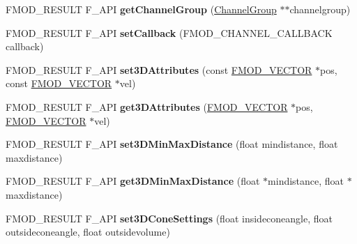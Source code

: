 \begin{DoxyCompactItemize}
\item 
\hypertarget{class_f_m_o_d_1_1_channel_a4b6d310d04eb844190db7a4074af2b2c}{F\-M\-O\-D\-\_\-\-R\-E\-S\-U\-L\-T F\-\_\-\-A\-P\-I {\bfseries get\-Channel\-Group} (\hyperlink{class_f_m_o_d_1_1_channel_group}{Channel\-Group} $\ast$$\ast$channelgroup)}\label{class_f_m_o_d_1_1_channel_a4b6d310d04eb844190db7a4074af2b2c}

\item 
\hypertarget{class_f_m_o_d_1_1_channel_a5cbbb69ad8d74d36d7b469a77450c3fa}{F\-M\-O\-D\-\_\-\-R\-E\-S\-U\-L\-T F\-\_\-\-A\-P\-I {\bfseries set\-Callback} (F\-M\-O\-D\-\_\-\-C\-H\-A\-N\-N\-E\-L\-\_\-\-C\-A\-L\-L\-B\-A\-C\-K callback)}\label{class_f_m_o_d_1_1_channel_a5cbbb69ad8d74d36d7b469a77450c3fa}

\item 
\hypertarget{class_f_m_o_d_1_1_channel_ae0bb0f7c1c1a807bde8ab9e9c3870785}{F\-M\-O\-D\-\_\-\-R\-E\-S\-U\-L\-T F\-\_\-\-A\-P\-I {\bfseries set3\-D\-Attributes} (const \hyperlink{struct_f_m_o_d___v_e_c_t_o_r}{F\-M\-O\-D\-\_\-\-V\-E\-C\-T\-O\-R} $\ast$pos, const \hyperlink{struct_f_m_o_d___v_e_c_t_o_r}{F\-M\-O\-D\-\_\-\-V\-E\-C\-T\-O\-R} $\ast$vel)}\label{class_f_m_o_d_1_1_channel_ae0bb0f7c1c1a807bde8ab9e9c3870785}

\item 
\hypertarget{class_f_m_o_d_1_1_channel_ab0f5e28337f9303c75f80d139201a858}{F\-M\-O\-D\-\_\-\-R\-E\-S\-U\-L\-T F\-\_\-\-A\-P\-I {\bfseries get3\-D\-Attributes} (\hyperlink{struct_f_m_o_d___v_e_c_t_o_r}{F\-M\-O\-D\-\_\-\-V\-E\-C\-T\-O\-R} $\ast$pos, \hyperlink{struct_f_m_o_d___v_e_c_t_o_r}{F\-M\-O\-D\-\_\-\-V\-E\-C\-T\-O\-R} $\ast$vel)}\label{class_f_m_o_d_1_1_channel_ab0f5e28337f9303c75f80d139201a858}

\item 
\hypertarget{class_f_m_o_d_1_1_channel_aa6ee9a231435079405ec4a2c2bd07c44}{F\-M\-O\-D\-\_\-\-R\-E\-S\-U\-L\-T F\-\_\-\-A\-P\-I {\bfseries set3\-D\-Min\-Max\-Distance} (float mindistance, float maxdistance)}\label{class_f_m_o_d_1_1_channel_aa6ee9a231435079405ec4a2c2bd07c44}

\item 
\hypertarget{class_f_m_o_d_1_1_channel_ae997142f79c9e96414f0ecce05fa93a3}{F\-M\-O\-D\-\_\-\-R\-E\-S\-U\-L\-T F\-\_\-\-A\-P\-I {\bfseries get3\-D\-Min\-Max\-Distance} (float $\ast$mindistance, float $\ast$maxdistance)}\label{class_f_m_o_d_1_1_channel_ae997142f79c9e96414f0ecce05fa93a3}

\item 
\hypertarget{class_f_m_o_d_1_1_channel_a9e0d8885d31b2978683d5305924de565}{F\-M\-O\-D\-\_\-\-R\-E\-S\-U\-L\-T F\-\_\-\-A\-P\-I {\bfseries set3\-D\-Cone\-Settings} (float insideconeangle, float outsideconeangle, float outsidevolume)}\label{class_f_m_o_d_1_1_channel_a9e0d8885d31b2978683d5305924de565}


\end{DoxyCompactItemize}

